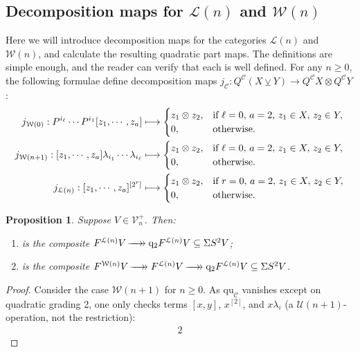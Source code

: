 \documentclass[11pt]{amsart} \renewcommand{\baselinestretch}{1.2}
\theoremstyle{plain}
\newtheorem{prop}[thm]{Proposition}
\numberwithin{equation}{section} %
\theoremstyle{plain}
\newtheorem{prop}[thm]{Proposition}
\numberwithin{equation}{chapter} %
\renewcommand{\to}{\longrightarrow}
\newcommand{\scrL}{\mathscr{L}}
\newcommand{\calU}{\mathcal{U}}
\newcommand{\calL}{\mathcal{L}}
\newcommand{\calV}{\mathcal{V}}
\newcommand{\calw}{\mathcal{W}}
\newcommand{\calc}{\mathcal{C}}
\newcommand{\restn}[1]{#1^{[2]}}
\newcommand{\restnRepeated}[2]{#1^{[2^{#2}]}}
\newcommand{\vect}[2]{\calV^{#1}_{#2}}
\newcommand{\quadratic}{\mathrm{qu}}
\newcommand{\quadgrad}[1]{\mathrm{q}_{#1}}
\newcommand{\epi}{{\,\makebox[0cm][l]{\ensuremath\to}\to{}}}
\newcommand{\restliealgs}{{\scrL\!\textit{ie}^\textit{r}}}
\newcommand{\smashcoprod}{\veebar}%
\newcommand{\SubsectionOrSection}[1]{\subsection{#1}}
\begin{document}
\begin{homotopy operations for PRLs}
\SubsectionOrSection{Decomposition maps for $\calL(n)$ and $\calw(n)$}
Here we will introduce decomposition maps for the categories $\calL(n)$ and $\calw(n)$, and calculate the resulting quadratic part maps. The definitions are simple enough, and the reader can verify that each is well defined. For any  $n\geq0$, the following formulae define decomposition maps $j_\calc:Q^\calc(X\smashcoprod Y)\to Q^\calc X\otimes Q^\calc Y$:
\begin{alignat*}{2}
j_{\calw(0)}:P^{i_\ell}\cdots P^{i_1}[z_1,\cdots ,z_a]&\longmapsto\begin{cases}
z_1\otimes z_2,&\textup{if }\ell=0,\,a=2,\,z_1\in X,\,z_2\in Y,
\\0,&\textup{otherwise.}
\end{cases}
\\
j_{\calw(n+1)}:[z_1,\cdots ,z_a]\lambda_{i_1}\cdots \lambda_{i_\ell}&\longmapsto\begin{cases}
z_1\otimes z_2,&\textup{if }\ell=0,\,a=2,\,z_1\in X,\,z_2\in Y,
\\0,&\textup{otherwise.}
\end{cases}
\\
j_{\calL(n)}:\restnRepeated{[z_1,\cdots ,z_a]}{r}&\longmapsto\begin{cases}
z_1\otimes z_2,&\textup{if }r=0,\,a=2,\,z_1\in X,\,z_2\in Y,
\\0,&\textup{otherwise.}
\end{cases}
\end{alignat*}
\begin{prop}
\label{quadpartcalc for various W and L}
Suppose $V\in\vect{+}{n}$. Then:
\begin{enumerate}
\item \makebox[\widthof{$\quadratic_\restliealgs$}][l]{$\quadratic_{\calL(n)}$} is the composite $F^{\calL(n)} V\epi \quadgrad{2}F^{\calL(n)} V\subseteq \Sigma S^2V$;
\item \makebox[\widthof{$\quadratic_\restliealgs$}][l]{$\quadratic_{\calw(n)}$} is the composite $F^{\calw(n)} V\epi F^{\calL(n)} V\epi \quadgrad{2}F^{\calL(n)} V\subseteq \Sigma S^2V$.\end{enumerate}
\end{prop}
\begin{proof}
Consider the case $\calw(n+1)$ for $n\geq0$. As $\quadratic_\calc$ vanishes except on quadratic grading 2, one only checks terms $[x,y]$, $\restn{x}$, and $x\lambda_i$ (a $\calU(n+1)$-operation, not the restriction):
\begin{alignat*}{2}

\end{alignat*}
\end{proof}
\end{homotopy operations for PRLs}
\end{document}
